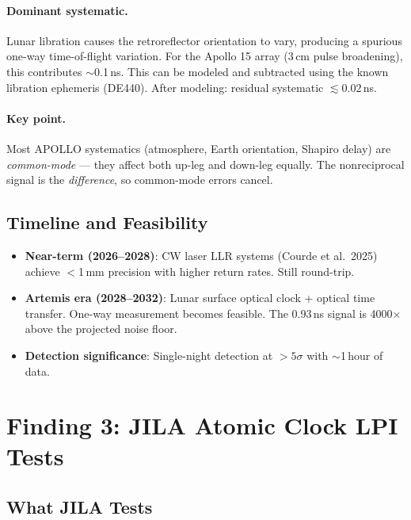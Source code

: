 \documentclass[11pt]{article}
\begin{document}
\paragraph{Dominant systematic.}
Lunar libration causes the retroreflector orientation to vary, producing
a spurious one-way time-of-flight variation. For the Apollo 15 array
(3\,cm pulse broadening), this contributes $\sim$0.1\,ns. This can be
modeled and subtracted using the known libration ephemeris (DE440).
After modeling: residual systematic $\lesssim 0.02$\,ns.

\paragraph{Key point.} Most APOLLO systematics (atmosphere, Earth
orientation, Shapiro delay) are \emph{common-mode} --- they affect both
up-leg and down-leg equally. The nonreciprocal signal is the
\emph{difference}, so common-mode errors cancel.

\subsection{Timeline and Feasibility}

\begin{itemize}
\item \textbf{Near-term (2026--2028)}: CW laser LLR systems (Courde et al.\
  2025) achieve $<$1\,mm precision with higher return rates.
  Still round-trip.
\item \textbf{Artemis era (2028--2032)}: Lunar surface optical clock +
  optical time transfer. One-way measurement becomes feasible.
  The 0.93\,ns signal is 4000$\times$ above the projected noise floor.
\item \textbf{Detection significance}: Single-night detection at $>5\sigma$
  with $\sim$1\,hour of data.
\end{itemize}

\section{Finding 3: JILA Atomic Clock LPI Tests}

\subsection{What JILA Tests}
\end{document}
